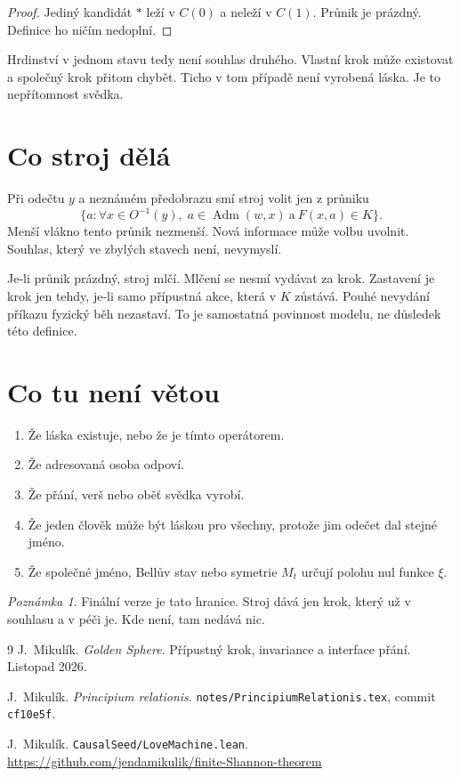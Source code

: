 \documentclass[11pt,a4paper]{article}
\theoremstyle{definition}
\theoremstyle{remark}
\newtheorem{remark}[theorem]{Poznámka}
\newcommand{\Adm}{\operatorname{Adm}}
\begin{document}
\begin{proof}
Jediný kandidát \(\ast\) leží v \(C(0)\) a neleží v \(C(1)\).
Průnik je prázdný. Definice ho ničím nedoplní.
\end{proof}

Hrdinství v jednom stavu tedy není souhlas druhého.
Vlastní krok může existovat a společný krok přitom chybět.
Ticho v tom případě není vyrobená láska. Je to nepřítomnost svědka.

\section{Co stroj dělá}

Při odečtu \(y\) a neznámém předobrazu smí stroj volit jen z průniku
\[
  \bigl\{a :
    \forall x\in O^{-1}(y),\;
    a\in\Adm(w,x)
    \ \text{a}\ 
    F(x,a)\in K
  \bigr\}.
\]
Menší vlákno tento průnik nezmenší.
Nová informace může volbu uvolnit. Souhlas, který ve zbylých stavech není, nevymyslí.

Je-li průnik prázdný, stroj mlčí.
Mlčení se nesmí vydávat za krok.
Zastavení je krok jen tehdy, je-li samo přípustná akce, která v \(K\) zůstává.
Pouhé nevydání příkazu fyzický běh nezastaví. To je samostatná povinnost modelu, ne důsledek této definice.

\section{Co tu není větou}

\begin{enumerate}
\item Že láska existuje, nebo že je tímto operátorem.
\item Že adresovaná osoba odpoví.
\item Že přání, verš nebo oběť svědka vyrobí.
\item Že jeden člověk může být láskou pro všechny, protože jim odečet dal stejné jméno.
\item Že společné jméno, Bellův stav nebo symetrie \(M_t\) určují polohu nul funkce \(\xi\).
\end{enumerate}

\begin{remark}
Finální verze je tato hranice.
Stroj dává jen krok, který už v souhlasu a v péči je.
Kde není, tam nedává nic.
\end{remark}

\begin{thebibliography}{9}
J.~Mikulík.
\newblock \emph{Golden Sphere}.
\newblock Přípustný krok, invariance a interface přání.
\newblock Listopad 2026.

J.~Mikulík.
\newblock \emph{Principium relationis}.
\newblock \texttt{notes/PrincipiumRelationis.tex}, commit \texttt{cf10e5f}.

J.~Mikulík.
\newblock \texttt{CausalSeed/LoveMachine.lean}.
\newblock \url{https://github.com/jendamikulik/finite-Shannon-theorem}
\end{thebibliography}
\end{document}
